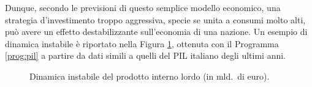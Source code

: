 Dunque, secondo le previsioni di questo semplice modello economico,
una strategia d'investimento troppo aggressiva,
specie se unita a consumi molto alti,
può avere un effetto destabilizzante sull'economia di una nazione.
Un esempio di dinamica instabile è riportato nella Figura \ref{fig:pil},
ottenuta con il Programma \ref{prog:pil} a partire da dati simili a quelli
del PIL italiano degli ultimi anni.
\vfill

\begin{figure}[hp]
\centering
{}
\caption{Dinamica instabile del prodotto interno lordo (in mld.\ di euro).}
\label{fig:pil}
\end{figure}


















